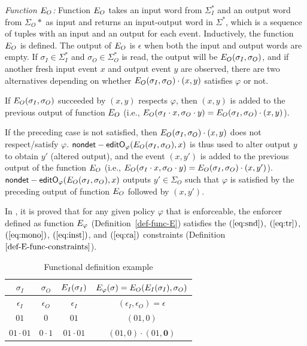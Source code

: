 {\textit{Function $E_{O}$:}
Function $E_{O}$ takes an input word from $\Sigma_I^*$ and an output word from $\Sigma_O*$ as input and returns an input-output word in $\Sigma^*$, which is a sequence of tuples with an input and an output for each event.
%
Inductively, the function $E_{O}$ is defined. The output of $E_{O}$ is $\epsilon$ when both the input and output words are empty.
If $\sigma_I\in\Sigma_I^*$ and $\sigma_O \in\Sigma_O^*$ is read, the output will be $E_{O}(\sigma_I,\sigma_O)$, and if another fresh input event $x$ and output event $y$ are observed, there are two alternatives depending on whether $E_{O}(\sigma_I,\sigma_O)\cdot(x,y)$ satisfies $\varphi$ or not.
\squishlist
\item If $E_{O}(\sigma_I,\sigma_O)$ succeeded by $(x,y)$ respects $\varphi$, then  $(x,y)$ is added to the previous output of function $E_{O}$ (i.e., $E_{O}(\sigma_I\cdot x,\sigma_O \cdot y) =  E_{O}(\sigma_I,\sigma_O) \cdot(x,y)$).
\item If the preceding case is not satisfied, then $E_{O}(\sigma_I,\sigma_O) \cdot(x,y)$ does not respect/satisfy $\varphi$. $\mathsf{{nondet}-editO_{\varphi}}(E_{O}(\sigma_I,\sigma_O), x)$ is thus used to alter output $y$ to obtain $y'$ (altered output), and the event $(x,y')$ is added to the previous output of the function $E_{O}$ (i.e., $E_{O}(\sigma_I\cdot x,\sigma_O \cdot y) =  E_{O}(\sigma_I,\sigma_O) \cdot(x,y')$).
$\mathsf{{nondet}-editO_{\varphi}}(E_{O}(\sigma_I,\sigma_O), x)$ outputs $y'\in \Sigma_O$ such that  $\varphi$ is satisfied by the preceding output of function $E_{O}$ followed by $(x,y')$.

\squishend
\begin{remark}
	\label{prop-constraints-funcdef}
	In \cite{spin17}, it is proved that for any given policy $\varphi$ that is enforceable, the enforcer defined as function $E_{\varphi}$ (Definition~\ref{def-func-E}) satisfies the $(\ref{eq:snd})$,
	$(\ref{eq:tr})$, $(\ref{eq:mono})$, $(\ref{eq:inst})$, and $(\ref{eq:ca})$ constraints (Definition $\ref{def-E-func-constraints}$).
\end{remark}
}
%
\begin{table}[t]
	\centering
	\begin{tabular}{|c|c|c|c|}
		\hline
		$\sigma_I$ & $\sigma_O$ & $E_{I}(\sigma_I)$ & $E_{\varphi}(\sigma)=E_{O}(E_{I}(\sigma_I), \sigma_O)$ \\
		\hline%
		$\epsilon_I$ & $\epsilon_O$ & $\epsilon_I$ & $(\epsilon_I,\epsilon_O) = \epsilon$\\
		\hline
		$01$ & $0$ & $01$ & $(01,0)$ \\
		\hline
		$01\cdot 01$ & $0\cdot1$ & $01\cdot01$ & $(01,0)\cdot(01,\textbf{0})$ \\
		\hline
	\end{tabular}
	\caption{Functional definition example}
	\label{tableEgFuncDef}
\end{table}
